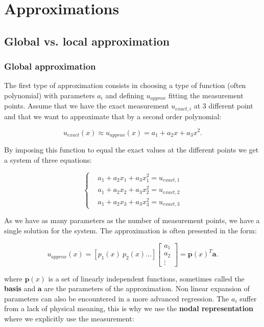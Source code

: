 \chapter{Approximations}
\section{Global vs. local approximation}
\subsection{Global approximation}
	The first type of approximation consists in choosing a type of function (often polynomial) with parameters $a_i$ and defining $u_{approx}$ fitting the measurement points. Assume that we have the exact measurement $u_{exact,i}$ at 3 different point and that we want to approximate that by a second order polynomial: 
	
	\begin{equation}
	u_{exact}(x) \approx u_{approx}(x) = a_1 + a_2 x + a_3 x^2.
	\end{equation}
	
	By imposing this function to equal the exact values at the different points we get a system of three equations: 
	
	\begin{equation}
	\left\{
	\begin{aligned}
	&a_1 + a_2 x_1 + a_3 x^2_1 = u_{exact,1}\\
	&a_1 + a_2 x_2 + a_3 x^2_2 = u_{exact,2}\\
	&a_1 + a_2 x_3 + a_3 x^2_3 = u_{exact,3}
	\end{aligned}
		\right.
	\end{equation}
	
	As we have as many parameters as the number of measurement points, we have a single solution for the system. The approximation is often presented in the form:
	
	\begin{equation}
	u_{approx} (x)= [p_1(x) \ p_2(x) \dots] \left[\begin{array}{c}
	a_1\\
	a_2\\
	\vdots	
\end{array}	 \right] = \bm{p}(x)^T \bm{a}.
	\end{equation}
	
	where $\bm{p}(x)$ is a set of linearly independent functions, sometimes called the \textbf{basis} and $\bm{a}$ are the parameters of the approximation. Non linear expansion of parameters can also be encountered in a more advanced regression. The $a_i$ suffer from a lack of physical meaning, this is why we use the \textbf{nodal representation} where we explicitly use the measurement:
	
